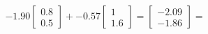 \documentclass[preview]{standalone}
\begin{document}
\begin{align*}
-1.90 \begin{bmatrix} 0.8 \\ 0.5 \end{bmatrix} + -0.57 \begin{bmatrix} 1 \\ 1.6 \end{bmatrix} = \begin{bmatrix} -2.09 \\ -1.86 \end{bmatrix} =
\end{align*}
\end{document}
